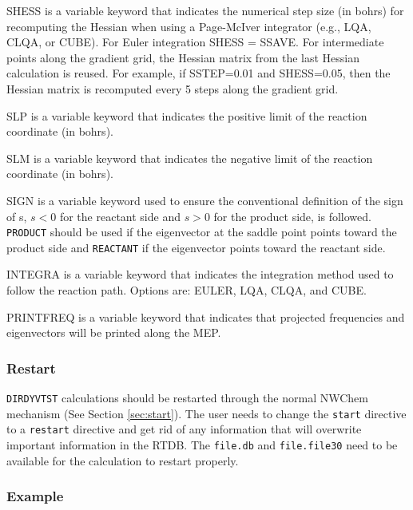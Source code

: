     SHESS is a variable keyword that indicates the numerical step
              size (in bohrs) for recomputing the Hessian when using a
              Page-McIver integrator (e.g., LQA, CLQA, or CUBE).  For
              Euler integration SHESS = SSAVE. For intermediate points
              along the gradient grid, the Hessian matrix from the
              last Hessian calculation is reused.  For example, if
              SSTEP=0.01 and SHESS=0.05, then the Hessian matrix is
              recomputed every 5 steps along the gradient grid.

    SLP is a variable keyword that indicates the positive limit of 
              the reaction coordinate (in bohrs).

    SLM is a variable keyword that indicates the negative limit of 
              the reaction coordinate (in bohrs).

    SIGN is a variable keyword used to ensure the conventional definition
              of the sign of s, $s < 0$ for the reactant side and
              $s > 0$ for the product side, is followed.  \verb+PRODUCT+
              should be used if the eigenvector at the saddle point points
              toward the product side and \verb+REACTANT+ if the
              eigenvector points toward the reactant side.

    INTEGRA is a variable keyword that indicates the integration
              method used to follow the reaction path.  Options are: EULER,
              LQA, CLQA, and CUBE.

    PRINTFREQ is a variable keyword that indicates that projected
              frequencies and eigenvectors will be printed along the MEP.

\subsubsection{Restart}

\verb+DIRDYVTST+ calculations should be restarted through the normal NWChem
mechanism (See Section \ref{sec:start}).  The user needs to change the
\verb+start+ directive to a \verb+restart+ directive and get rid of any
information that will overwrite important information in the RTDB.  The
\verb+file.db+ and \verb+file.file30+ need to be available for the
calculation to restart properly.

\subsubsection{Example}

